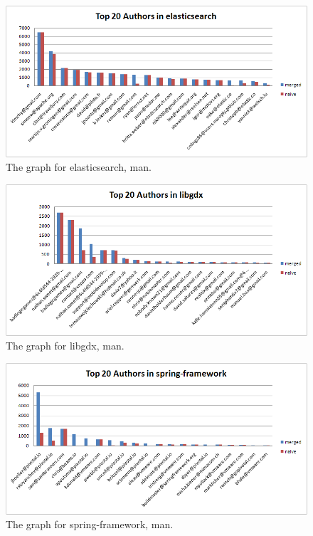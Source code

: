 \begin{figure}[h]
  \centering
  \includegraphics[width=1\textwidth]{../presentation/img/graph-elasticsearch.png}
  \caption{The graph for elasticsearch, man.}
  \label{fig:graph-elasticsearch}
\end{figure}

\begin{figure}[h]
  \centering
  \includegraphics[width=1\textwidth]{../presentation/img/graph-libgdx.png}
  \caption{The graph for libgdx, man.}
  \label{fig:graph-libgdx}
\end{figure}

\begin{figure}[h]
  \centering
  \includegraphics[width=1\textwidth]{../presentation/img/graph-spring-framework.png}
  \caption{The graph for spring-framework, man.}
  \label{fig:graph-spring-framework}
\end{figure}
